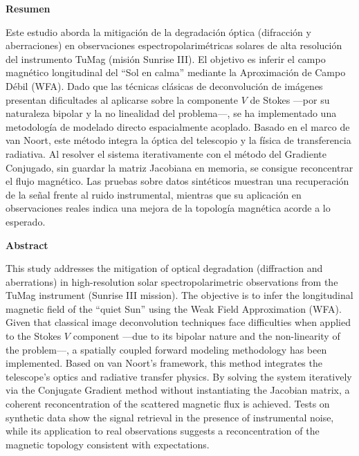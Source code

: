 \documentclass[11pt,a4paper,twoside]{article}
\numberwithin{equation}{section}
\begin{document}
\newpage
%
\begin{center}
{\bf Resumen}
\bigskip

\begin{minipage}{0.8\linewidth}
Este estudio aborda la mitigación de la degradación óptica (difracción y aberraciones) en observaciones espectropolarimétricas solares de alta resolución del instrumento TuMag (misión Sunrise III). El objetivo es inferir el campo magnético longitudinal del ``Sol en calma'' mediante la Aproximación de Campo Débil (WFA). Dado que las técnicas clásicas de deconvolución de imágenes presentan dificultades al aplicarse sobre la componente $V$ de Stokes ---por su naturaleza bipolar y la no linealidad del problema---, se ha implementado una metodología de modelado directo espacialmente acoplado. Basado en el marco de van Noort, este método integra la óptica del telescopio y la física de transferencia radiativa. Al resolver el sistema iterativamente con el método del Gradiente Conjugado, sin guardar la matriz Jacobiana en memoria, se consigue reconcentrar el flujo magnético. Las pruebas sobre datos sintéticos muestran una recuperación de la señal frente al ruido instrumental, mientras que su aplicación en observaciones reales indica una mejora de la topología magnética acorde a lo esperado.
\end{minipage}

\vfill

{\bf Abstract} 
\bigskip

\begin{minipage}{0.8\linewidth}
This study addresses the mitigation of optical degradation (diffraction and aberrations) in high-resolution solar spectropolarimetric observations from the TuMag instrument (Sunrise III mission). The objective is to infer the longitudinal magnetic field of the ``quiet Sun'' using the Weak Field Approximation (WFA). Given that classical image deconvolution techniques face difficulties when applied to the Stokes $V$ component ---due to its bipolar nature and the non-linearity of the problem---, a spatially coupled forward modeling methodology has been implemented. Based on van Noort's framework, this method integrates the telescope's optics and radiative transfer physics. By solving the system iteratively via the Conjugate Gradient method without instantiating the Jacobian matrix, a coherent reconcentration of the scattered magnetic flux is achieved. Tests on synthetic data show the signal retrieval in the presence of instrumental noise, while its application to real observations suggests a reconcentration of the magnetic topology consistent with expectations.
\end{minipage}

\vfill

\end{center}
\end{document}
